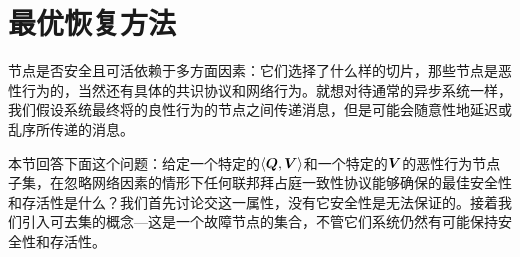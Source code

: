 \section{最优恢复方法}\label{sec:resilience}

节点是否安全且可活依赖于多方面因素：它们选择了什么样的{\quorum}切片，那些节点是恶性行为的，当然还有具体的共识协议和网络行为。就想对待通常的异步系统一样，我们假设系统最终将的良性行为的节点之间传递消息，但是可能会随意性地延迟或乱序所传递的消息。

本节回答下面这个问题：给定一个特定的$\langle{\bm Q},{\bm V}\rangle$和一个特定的${\bm V}$的恶性行为节点子集，在忽略网络因素的情形下任何联邦拜占庭一致性协议能够确保的最佳安全性和存活性是什么？我们首先讨论{\quorum}交这一属性，没有它安全性是无法保证的。接着我们引入可去集的概念---这是一个故障节点的集合，不管它们系统仍然有可能保持安全性和存活性。



